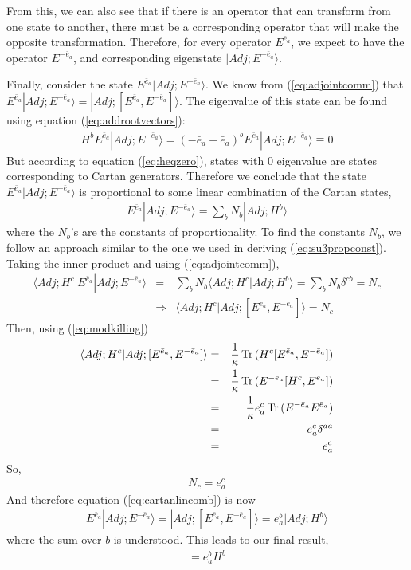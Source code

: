 \documentclass[12pt,epsf]{article}
\def\nolabel{\nonumber }
\def\nolabel{\nonumber }
\def\Tr{\mathop{\rm Tr \,} \nolimits}
\begin{document}
From this, we can also see that if
there is an operator that can transform from one state to another,
there must be a corresponding operator that will make the opposite
transformation.  Therefore, for every operator $E^{\bar e_a}$, we
expect to have the operator $E^{-\bar e_a}$, and corresponding
eigenstate $|Adj;E^{-\bar e_a}\rangle$.  

Finally, consider the state $E^{\bar e_a}|Adj;E^{-\bar e_a}\rangle$. 
We know from (\ref{eq:adjointcomm}) that $E^{\bar e_a}|Adj;E^{-\bar
e_a}\rangle = |Adj;[E^{\bar e_a},E^{-\bar e_a}]\rangle$.  The
eigenvalue of this state can be found using equation
(\ref{eq:addrootvectors}):
\begin{eqnarray}
H^bE^{\bar e_a}|Adj;E^{-\bar e_a}\rangle = (-\bar e_a+\bar
e_a)^bE^{\bar e_a}|Adj;E^{-\bar e_a}\rangle \equiv 0\nolabel
\end{eqnarray}
But according to equation (\ref{eq:heqzero}), states with 0
eigenvalue are states corresponding to Cartan generators.  Therefore we
conclude that the state $E^{\bar e_a}|Adj;E^{-\bar e_a}\rangle$ is
proportional to some linear combination of the Cartan states, 
\begin{eqnarray}
E^{\bar e_a}|Adj;E^{-\bar e_a}\rangle = \sum_bN_b|Adj;H^b\rangle
\label{eq:cartanlincomb}
\end{eqnarray}
where the $N_b$'s are the constants of proportionality.  To find the
constants $N_b$, we follow an approach similar to the one we used in
deriving (\ref{eq:su3propconst}).  Taking the inner product and using
(\ref{eq:adjointcomm}), 
\begin{eqnarray}
\langle Adj;H^c|E^{\bar e_a}|Adj;E^{-\bar e_a}\rangle &=& \sum_b
N_b\langle Adj;H^c|Adj;H^b\rangle = \sum_bN_b\delta^{cb} = N_c \\
&\Rightarrow& \langle Adj;H^c|Adj;[E^{\bar e_a},E^{-\bar e_a}]\rangle =
N_c\nolabel
\end{eqnarray}
Then, using (\ref{eq:modkilling})
\begin{eqnarray}
\langle Adj;H^c|Adj;[E^{\bar e_a},E^{-\bar e_a}]\rangle &=& {1\over
\kappa}\Tr(H^c[E^{\bar e_a},E^{-\bar e_a}]) \nolabel \\
&=& {1\over \kappa}\Tr(E^{-\bar e_a}[H^c,E^{\bar e_a}]) \nolabel \\
&=& {1\over \kappa}e^c_a\Tr(E^{-\bar e_a}E^{\bar e_a}) \nolabel \\
&=& e^c_a \delta^{aa} \nolabel \\
&=& e^c_a\nolabel
\end{eqnarray}
So, 
\begin{eqnarray}
N_c = e^c_a\nolabel
\end{eqnarray}
And therefore equation (\ref{eq:cartanlincomb}) is now
\begin{eqnarray}
E^{\bar e_a}|Adj;E^{-\bar e_a}\rangle = |Adj;[E^{\bar e_a},E^{-\bar
e_a}]\rangle = e^b_a|Adj;H^b\rangle\nolabel
\end{eqnarray}
where the sum over $b$ is understood.  This leads to our final result,
\begin{eqnarray}
[E^{\bar e_a},E^{-\bar e_a}] = e^b_a H^b
\label{eq:finalresultrootspace}
\end{eqnarray}
\end{document}
